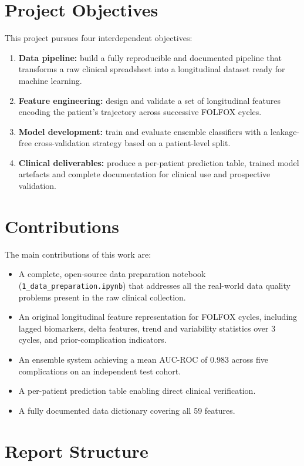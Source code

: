 \documentclass[12pt,a4paper]{report}
\begin{document}
\section{Project Objectives}

This project pursues four interdependent objectives:
\begin{enumerate}
  \item \textbf{Data pipeline:} build a fully reproducible and documented pipeline that transforms a raw clinical spreadsheet into a longitudinal dataset ready for machine learning.
  \item \textbf{Feature engineering:} design and validate a set of longitudinal features encoding the patient's trajectory across successive FOLFOX cycles.
  \item \textbf{Model development:} train and evaluate ensemble classifiers with a leakage-free cross-validation strategy based on a patient-level split.
  \item \textbf{Clinical deliverables:} produce a per-patient prediction table, trained model artefacts and complete documentation for clinical use and prospective validation.
\end{enumerate}

\section{Contributions}

The main contributions of this work are:
\begin{itemize}
  \item A complete, open-source data preparation notebook ({\tt 1\_data\_preparation.ipynb}) that addresses all the real-world data quality problems present in the raw clinical collection.
  \item An original longitudinal feature representation for FOLFOX cycles, including lagged biomarkers, delta features, trend and variability statistics over 3 cycles, and prior-complication indicators.
  \item An ensemble system achieving a mean AUC-ROC of 0.983 across five complications on an independent test cohort.
  \item A per-patient prediction table enabling direct clinical verification.
  \item A fully documented data dictionary covering all 59 features.
\end{itemize}

\section{Report Structure}
\end{document}
